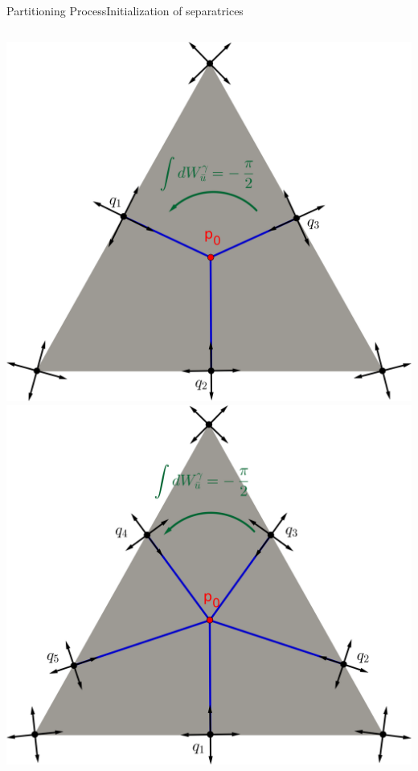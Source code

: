 \documentclass[compress,10pt,aspectratio=169]{beamer}
\begin{document}
\begin{frame}{Partitioning Process}{Initialization of separatrices}
\small
\begin{columns}
\begin{column}{0.7\textwidth}
\centering
\includegraphics[scale=0.38]{images/triangle separatrices 3.png}
\includegraphics[scale=0.38]{images/triangle separatrices 5.png}
\end{column}


\end{columns}
\end{frame}
\end{document}
